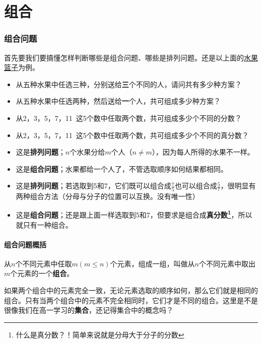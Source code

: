 \part{\textbf{组合}}

\section{组合问题}

首先要我们要搞懂怎样判断哪些是组合问题、哪些是排列问题。还是以上面的\underline{水果篮子}为例。
\begin{itemize}
    \item 从五种水果中任选三种，分别送给\textbf{三}个不同的人，请问共有多少种方案？
    \item 从五种水果中任选两种，然后送给\textbf{一}个人，共可组成多少种方案？
    \item 从2，3，5，7，11~这5个数中任取两个数，共可组成多少个不同的分数？
    \item 从2，3，5，7，11~这5个数中任取两个数，共可组成多少个不同的真分数？
\end{itemize}

\leftline{{\color{blue} {\large 解答}}}
\begin{itemize}
    \item 这是\textbf{排列问题}；$n$个水果分给$m$个人（$n \ne m$），因为每人所得的水果不一样。
    \item 这是\textbf{组合问题}；水果都给一个人了，不管选取顺序如何结果都相同。%
    \item 这是\textbf{排列问题}；若选取到5和7，它们既可以组合成$\frac{7}{5}$也可以组合成$\frac{5}{7}$，很明显有两种组合方法（分母与分子的位置可以互换。没有唯一性）
    \item 这是\textbf{组合问题}；还是跟上面一样选取到5和7，但要求是组合成\textbf{真分数\footnote{什么是真分数？！简单来说就是分母大于分子的分数}}，所以就只有一种组合。
\end{itemize}

\subsection{组合问题概括}
从$n$个不同元素中任取$m(m \le n)$个元素，组成一组，叫做从$n$个不同元素中取出$m$个元素的一个\textbf{组合}。

如果两个组合中的元素完全一致，无论元素选取的顺序如何，那么它们就是相同的组合。只有当两个组合中的元素不完全相同时，它们才是不同的组合。这里是不是很像我们在高一学习的\textbf{集合}，还记得集合中的概念吗？

